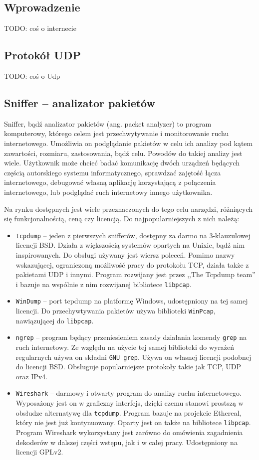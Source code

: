 \documentclass[a4paper, 12pt, twoside, openright]{article}
\begin{document}
	\subsection{Wprowadzenie}
	TODO: coś o internecie
	\subsection{Protokół UDP}
	TODO: coś o Udp
	\subsection{Sniffer -- analizator pakietów}
	\indent\par
	Sniffer, bądź analizator pakietów (ang. packet analyzer) to program komputerowy, którego celem jest przechwytywanie
	i monitorowanie ruchu internetowego. Umożliwia on
	podglądanie pakietów w celu ich analizy pod kątem zawartości, rozmiaru, zastosowania, bądź celu. Powodów do takiej
	analizy jest wiele. Użytkownik może chcieć badać komunikację dwóch urządzeń będących częścią autorskiego systemu
	informatycznego, sprawdzać zajętość łącza internetowego, debugować własną aplikację korzystającą z połączenia internetowego,
	lub podglądać ruch internetowy innego użytkownika.

	Na rynku dostępnych jest wiele przeznaczonych do tego celu narzędzi, różniących się funkcjonalnością, ceną czy licencją.
	Do najpopularniejszych z nich należą:
	\begin{itemize}
		\item \texttt{tcpdump} -- jeden z pierwszych snifferów, dostępny za darmo na 3-klauzulowej licencji BSD. Działa
			z większością systemów opartych na Unixie, bądź nim inspirowanych. Do obsługi używany jest wiersz poleceń.
			Pomimo nazwy wskazującej, ograniczoną możliwość pracy do protokołu TCP, działa także z pakietami UDP i innymi.
			Program rozwijany jest przez ,,The Tcpdump team'' i bazuje na wspólnie z nim rozwijanej bibliotece \texttt{libpcap}.
		\item \texttt{WinDump} -- port tcpdump na platformę Windows, udostępniony na tej samej licencji. Do przechywtywania
			pakietów używa biblioteki \texttt{WinPcap}, nawiązującej do \texttt{libpcap}.
		\item \texttt{ngrep} -- program będący przeniesieniem zasady działania komendy \texttt{grep} na ruch internetowy.
			Ze względu na użycie tej samej biblioteki do wyrażeń regularnych używa on składni \texttt{GNU grep}.
			Używa on własnej licencji podobnej do licencji BSD. Obsługuje popularniejsze protokoły takie jak TCP, UDP oraz IPv4.
		\item \texttt{Wireshark} -- darmowy i otwarty program do analizy ruchu internetowego. Wyposażony jest on w graficzny
			interfejs, dzięki czemu stanowi prostszą w obsłudze alternatywę dla \texttt{tcpdump}. Program bazuje na projekcie
			Ethereal, który nie jest już kontynuowany. Oparty jest on także na bibliotece
			\texttt{libpcap}. Program Wireshark wykorzystany jest zarówno
			do omówienia zagadnienia dekoderów w dalszej części wstępu, jak i w całej pracy. Udostępniony na licencji GPLv2.
	\end{itemize}
\end{document}
